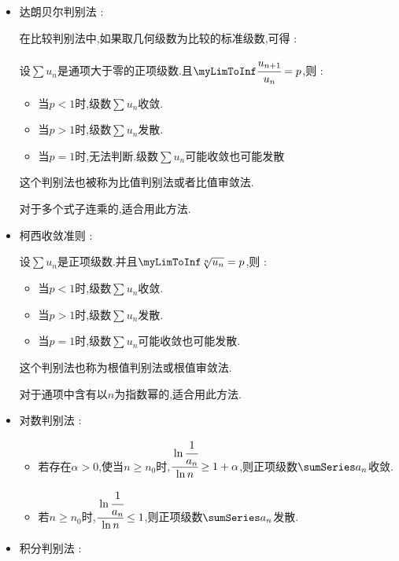 {{{{\begin{itemize}
{            如果$\myLimToInf\cfrac{u_n}{v_n} = \infty$,则 :
            \begin{itemize}
              \item 当$\sum u_n$收敛时,可推出$\sum v_n$也收敛.
              \item 当$\sum v_n$发散时,可推出$\sum u_n$也发散.
            \end{itemize}

            注 : 使用此方法常常是采用等价无穷小替换或与$p$级数作比较,寻找同阶无穷小来判别原级数的敛散性.
            }
      \item{
            达朗贝尔判别法 :

            在比较判别法中,如果取几何级数为比较的标准级数,可得 :

            设$\sum u_n$是通项大于零的正项级数.且$\myLimToInf \cfrac{u_{n + 1}}{u_n} = p$,则 :
            \begin{itemize}
              \item 当$p < 1$时,级数$\sum u_n$收敛.
              \item 当$p > 1$时,级数$\sum u_n$发散.
              \item 当$p = 1$时,无法判断.级数$\sum u_n$可能收敛也可能发散
            \end{itemize}

            这个判别法也被称为比值判别法或者比值审敛法.

            对于多个式子连乘的,适合用此方法.
            }
      \item {
            柯西收敛准则 :

            设$\sum u_n$是正项级数.并且$\myLimToInf \sqrt[n]{u_n} = p$,则 :
            \begin{itemize}
              \item 当$p < 1$时,级数$\sum u_n$收敛.
              \item 当$p > 1$时,级数$\sum u_n$发散.
              \item 当$p = 1$时,级数$\sum u_n$可能收敛也可能发散.
            \end{itemize}

            这个判别法也称为根值判别法或根值审敛法.

            对于通项中含有以$n$为指数幂的,适合用此方法.
            }
      \item{
            对数判别法 :

            \begin{itemize}
              \item 若存在$\alpha > 0$,使当$n \geq n_0$时,$\cfrac{\ln\cfrac{1}{a_n}}{\ln n} \geq 1 + \alpha$,则正项级数$\sumSeries a_n$收敛.
              \item 若$n \geq n_0$时,$\cfrac{\ln\cfrac{1}{a_n}}{\ln n} \leq 1$,则正项级数$\sumSeries a_n$发散.
            \end{itemize}
            }
      \item {
            积分判别法 :

}
\end{itemize}}}}}

